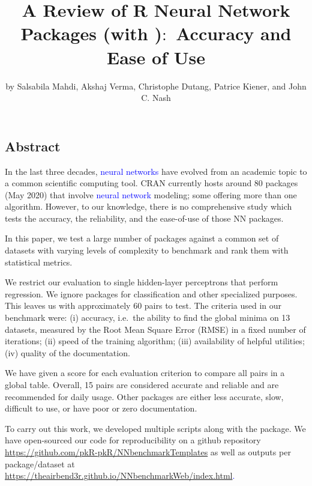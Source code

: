 \title{A Review of R Neural Network Packages (with
)\(:\) Accuracy and Ease of Use}
\author{by Salsabila Mahdi, Akshaj Verma, Christophe Dutang, Patrice
Kiener, and John C. Nash}

\maketitle


\hypertarget{abstract}{%
\subsection{Abstract}\label{abstract}}

In the last three decades, \textcolor{blue}{neural networks} have
evolved from an academic topic to a common scientific computing tool.
CRAN currently hosts around 80 packages (May 2020) that involve
\textcolor{blue}{neural network} modeling; some offering more than one
algorithm. However, to our knowledge, there is no comprehensive study
which tests the accuracy, the reliability, and the ease-of-use of those
NN packages.

In this paper, we test a large number of packages against a common set
of datasets with varying levels of complexity to benchmark and rank them
with statistical metrics.

We restrict our evaluation to single hidden-layer perceptrons that
perform regression. We ignore packages for classification and other
specialized purposes. This leaves us with approximately 60
 pairs to test. The criteria used in our
benchmark were: (i) accuracy, i.e.~the ability to find the global minima
on 13 datasets, measured by the Root Mean Square Error (RMSE) in a fixed
number of iterations; (ii) speed of the training algorithm; (iii)
availability of helpful utilities; (iv) quality of the documentation.

We have given a score for each evaluation criterion to compare all
 pairs in a global table. Overall, 15 pairs are
considered accurate and reliable and are recommended for daily usage.
Other packages are either less accurate, slow, difficult to use, or have
poor or zero documentation.

To carry out this work, we developed multiple scripts along with the
 package. We have open-sourced our code for
reproducibility on a github repository
\url{https://github.com/pkR-pkR/NNbenchmarkTemplates} as well as outputs
per package/dataset at
\textcolor{blue}{\url{https://theairbend3r.github.io/NNbenchmarkWeb/index.html}.}

